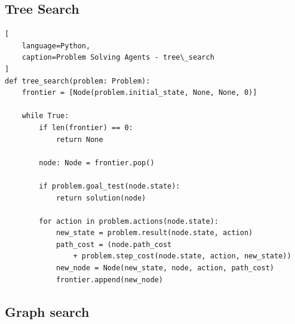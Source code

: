 \subsection{Tree Search}
\vspace{0.2cm}

\begin{algorithm}[H]
    \caption{An informal description of the general tree-search algorithm. \cite{ai/book/Artificial-Intelligence-A-Modern-Approach/Russell-Norvig}}

\end{algorithm}


\begin{lstlisting}[
    language=Python,
    caption=Problem Solving Agents - tree\_search
]
def tree_search(problem: Problem):
    frontier = [Node(problem.initial_state, None, None, 0)]

    while True:
        if len(frontier) == 0:
            return None
        
        node: Node = frontier.pop()

        if problem.goal_test(node.state):
            return solution(node)
        
        for action in problem.actions(node.state):
            new_state = problem.result(node.state, action)
            path_cost = (node.path_cost 
                + problem.step_cost(node.state, action, new_state))
            new_node = Node(new_state, node, action, path_cost)
            frontier.append(new_node)
\end{lstlisting}




\subsection{Graph search}
\vspace{0.2cm}

